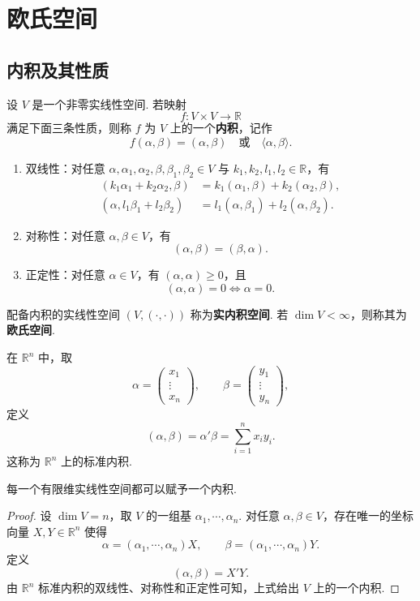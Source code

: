 \setchapterintro{}
\chapter{欧氏空间}
\section{内积及其性质}
\begin{definition}
	设 $V$ 是一个非零实线性空间. 若映射
	\[
	f:V\times V\longrightarrow \mathbb{R}
	\]
	满足下面三条性质，则称 $f$ 为 $V$ 上的一个\textbf{内积}，记作
	\[
	f(\alpha,\beta)=(\alpha,\beta)\quad \text{或}\quad \langle \alpha,\beta\rangle .
	\]
	\begin{enumerate}
		\item 双线性：对任意 $\alpha,\alpha_1,\alpha_2,\beta,\beta_1,\beta_2\in V$ 与 $k_1,k_2,l_1,l_2\in\mathbb{R}$，有
		\[
		\begin{aligned}
			(k_1\alpha_1+k_2\alpha_2,\beta)&=k_1(\alpha_1,\beta)+k_2(\alpha_2,\beta),\\
			(\alpha,l_1\beta_1+l_2\beta_2)&=l_1(\alpha,\beta_1)+l_2(\alpha,\beta_2).
		\end{aligned}
		\]
		\item 对称性：对任意 $\alpha,\beta\in V$，有
		\[
		(\alpha,\beta)=(\beta,\alpha).
		\]
		\item 正定性：对任意 $\alpha\in V$，有 $(\alpha,\alpha)\geqslant 0$，且
		\[
		(\alpha,\alpha)=0\Longleftrightarrow \alpha=0.
		\]
	\end{enumerate}
	配备内积的实线性空间 $(V,(\cdot,\cdot))$ 称为\textbf{实内积空间}. 若 $\dim V<\infty$，则称其为\textbf{欧氏空间}.
\end{definition}

\begin{example}
	在 $\mathbb{R}^n$ 中，取
	\[
	\alpha=\begin{pmatrix}x_1\\ \vdots\\ x_n\end{pmatrix},
	\qquad
	\beta=\begin{pmatrix}y_1\\ \vdots\\ y_n\end{pmatrix},
	\]
	定义
	\[
	(\alpha,\beta)=\alpha'\beta=\sum_{i=1}^{n}x_i y_i.
	\]
	这称为 $\mathbb{R}^n$ 上的标准内积.
\end{example}

\begin{proposition}
	每一个有限维实线性空间都可以赋予一个内积.
\end{proposition}
\begin{proof}
	设 $\dim V=n$，取 $V$ 的一组基 $\alpha_1,\cdots,\alpha_n$. 对任意 $\alpha,\beta\in V$，存在唯一的坐标向量 $X,Y\in\mathbb{R}^n$ 使得
	\[
	\alpha=(\alpha_1,\cdots,\alpha_n)X,
	\qquad
	\beta=(\alpha_1,\cdots,\alpha_n)Y.
	\]
	定义
	\[
	(\alpha,\beta)=X'Y.
	\]
	由 $\mathbb{R}^n$ 标准内积的双线性、对称性和正定性可知，上式给出 $V$ 上的一个内积.
\end{proof}

